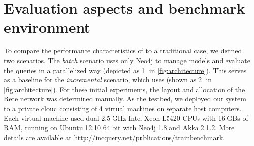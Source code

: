 



\label{benchmark_environment}
\section{Evaluation aspects and benchmark environment}

To compare the performance characteristics of \iqd{} to a traditional case, we defined two scenarios. The \textit{batch} scenario uses only Neo4j to manage models and evaluate the queries in a parallelized way (depicted as \textcircled{1} in \autoref{fig:architecture}). This serves as a baseline for the \textit{incremental} scenario, which uses \iqd{} (shown as \textcircled{2} in \autoref{fig:architecture}). For these initial experiments, the layout and allocation of the Rete network was determined manually. As the testbed, we deployed our system to a private cloud consisting of 4 virtual machines on separate host computers. Each virtual machine used dual 2.5 GHz Intel Xeon L5420 CPUs with 16 GBs of RAM, running on Ubuntu 12.10 64 bit with Neo4j 1.8 and Akka 2.1.2. More details are available at \url{http://incquery.net/publications/trainbenchmark}.

